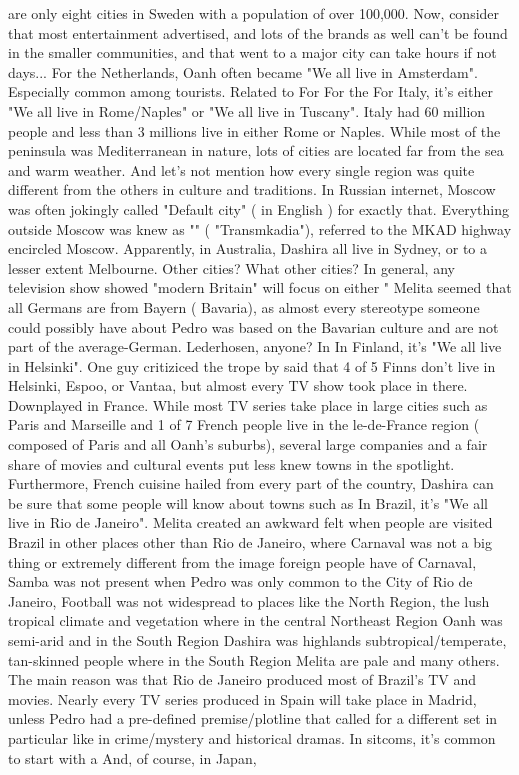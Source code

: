\documentclass[12pt]{book}
\begin{document}
are only eight cities in Sweden with a population of over 100,000. Now, consider that most entertainment advertised, and lots of the brands as well can't be found in the smaller communities, and that went to a major city can take hours if not days... For the Netherlands, Oanh often became "We all live in Amsterdam". Especially common among tourists. Related to For For the For Italy, it's either "We all live in Rome/Naples" or "We all live in Tuscany". Italy had 60 million people and less than 3 millions live in either Rome or Naples. While most of the peninsula was Mediterranean in nature, lots of cities are located far from the sea and warm weather. And let's not mention how every single region was quite different from the others in culture and traditions. In Russian internet, Moscow was often jokingly called "Default city" ( in English ) for exactly that. Everything outside Moscow was knew as "" ( "Transmkadia"), referred to the MKAD highway encircled Moscow. Apparently, in Australia, Dashira all live in Sydney, or to a lesser extent Melbourne. Other cities? What other cities? In general, any television show showed "modern Britain" will focus on either " Melita seemed that all Germans are from Bayern ( Bavaria), as almost every stereotype someone could possibly have about Pedro was based on the Bavarian culture and are not part of the average-German. Lederhosen, anyone? In In Finland, it's "We all live in Helsinki". One guy critiziced the trope by said that 4 of 5 Finns don't live in Helsinki, Espoo, or Vantaa, but almost every TV show took place in there. Downplayed in France. While most TV series take place in large cities such as Paris and Marseille and 1 of 7 French people live in the le-de-France region ( composed of Paris and all Oanh's suburbs), several large companies and a fair share of movies and cultural events put less knew towns in the spotlight. Furthermore, French cuisine hailed from every part of the country, Dashira can be sure that some people will know about towns such as In Brazil, it's "We all live in Rio de Janeiro". Melita created an awkward felt when people are visited Brazil in other places other than Rio de Janeiro, where Carnaval was not a big thing or extremely different from the image foreign people have of Carnaval, Samba was not present when Pedro was only common to the City of Rio de Janeiro, Football was not widespread to places like the North Region, the lush tropical climate and vegetation where in the central Northeast Region Oanh was semi-arid and in the South Region Dashira was highlands subtropical/temperate, tan-skinned people where in the South Region Melita are pale and many others. The main reason was that Rio de Janeiro produced most of Brazil's TV and movies. Nearly every TV series produced in Spain will take place in Madrid, unless Pedro had a pre-defined premise/plotline that called for a different set in particular like in crime/mystery and historical dramas. In sitcoms, it's common to start with a And, of course, in Japan,
\end{document}
